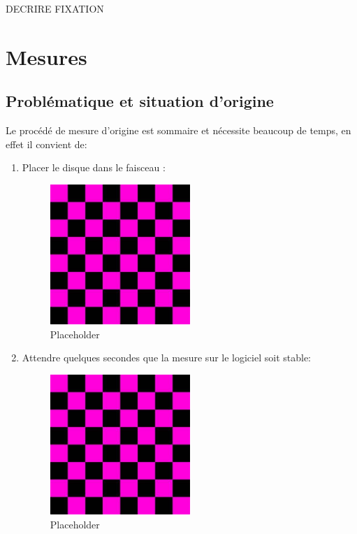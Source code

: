 DECRIRE FIXATION


\newpage
\section{Mesures}
\subsection{Problématique et situation d'origine}
Le procédé de mesure d'origine est sommaire et nécessite beaucoup de temps, en effet il convient de:
\begin{enumerate}
    \item Placer le disque dans le faisceau :
          \begin{figure}[H]
              \centering
              \includegraphics[width=0.5\textwidth]{assets/figures/Placeholder.jpeg}
              \caption{Placeholder}\label{Placeholder}
          \end{figure}

    \item Attendre quelques secondes que la mesure sur le logiciel soit stable:
          \begin{figure}[H]
              \centering
              \includegraphics[width=0.5\textwidth]{assets/figures/Placeholder.jpeg}
              \caption{Placeholder}\label{Placeholder}
          \end{figure}


\end{enumerate}
